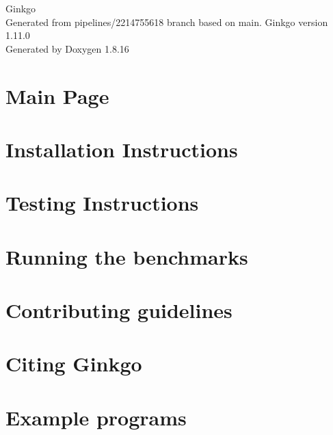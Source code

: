 \let\mypdfximage\pdfximage\def\pdfximage{\immediate\mypdfximage}\documentclass[twoside]{book}
\newcommand{\+}{\discretionary{\mbox{\scriptsize$\hookleftarrow$}}{}{}}
\newcommand{\clearemptydoublepage}{%
  \newpage{\pagestyle{empty}\cleardoublepage}%
}
\begin{document}
\hypersetup{pageanchor=false,
             bookmarksnumbered=true,
             pdfencoding=unicode
            }
\begin{titlepage}
\vspace*{7cm}
\begin{center}%
{\Large Ginkgo \\[1ex]\large Generated from pipelines/2214755618 branch based on main. Ginkgo version 1.\+11.\+0 }\\
\vspace*{1cm}
{\large Generated by Doxygen 1.8.16}\\
\end{center}
\end{titlepage}
\clearemptydoublepage
{}
\tableofcontents
\clearemptydoublepage
{}
\hypersetup{pageanchor=true}

\chapter{Main Page}
\label{index}\hypertarget{index}{}
\chapter{Installation Instructions}
\label{install_ginkgo}

\chapter{Testing Instructions}
\label{testing_ginkgo}

\chapter{Running the benchmarks}
\label{benchmarking_ginkgo}

\chapter{Contributing guidelines}
\label{contributing_guidelines}

\chapter{Citing Ginkgo}
\label{citing_ginkgo}

\chapter{Example programs}
\label{Examples}

\end{document}
